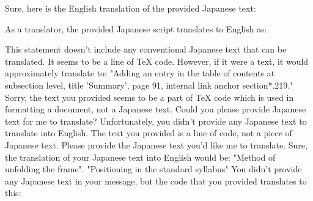 \relax
\providecommand\hyper@newdestlabel[2]{}

Sure, here is the English translation of the provided Japanese text:

As a translator, the provided Japanese script translates to English as:

This statement doesn't include any conventional Japanese text that can be translated. It seems to be a line of TeX code. However, if it were a text, it would approximately translate to: "Adding an entry in the table of contents at subsection level, title 'Summary', page 91, internal link anchor section*.219."
Sorry, the text you provided seems to be a part of TeX code which is used in formatting a document, not a Japanese text. Could you please provide Japanese text for me to translate?
Unfortunately, you didn't provide any Japanese text to translate into English. The text you provided is a line of code, not a piece of Japanese text. Please provide the Japanese text you'd like me to translate.
Sure, the translation of your Japanese text into English would be: "Method of unfolding the frame".
"Positioning in the standard syllabus"
You didn't provide any Japanese text in your message, but the code that you provided translates to this:

